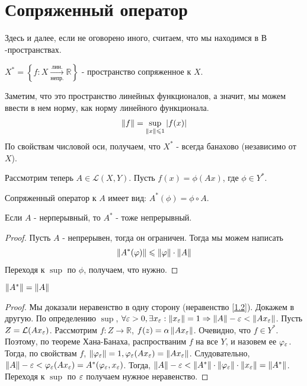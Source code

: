 \section{Сопряженный оператор}

Здесь и далее, если не оговорено иного, считаем, что мы находимся в $В$-пространствах.

\begin{definition}
	$X^* = \left\{ f : X \xrightarrow[\text{непр.}]{\text{лин.}} \mathbb{R} \right\}$ - пространство сопряженное к $X$.
\end{definition}
Заметим, что это пространство линейных функционалов, а значит, мы можем ввести в нем норму, как норму линейного функционала.
\begin{gather}
	\left\|f\right\| = \sup\limits_{\left\|x\right\| \leqslant 1} \left|f(x)\right| 
\end{gather}
По свойствам числовой оси, получаем, что $X^*$ - всегда банахово (независимо от $X$).

Рассмотрим теперь $A \in \mathcal{L}(X, Y)$. Пусть $f(x) = \phi(Ax)$, где $\phi \in Y^*$.
\begin{definition}
	Сопряженный оператор к $A$ имеет вид: $A^*(\phi) = \phi \circ A$.
\end{definition}
\begin{statement}
	Если $A$ - нерперывный, то $A^*$ - тоже непрерывный.
\end{statement}
\begin{proof}
	Пусть $A$ - непрерывен, тогда он ограничен. Тогда мы можем написать
	\begin{gather}
		\left\|A^*(\varphi)\right\| \leqslant \left\|\varphi\right\| \cdot \left\|A\right\| \label{1.2}
	\end{gather}
	Переходя к $\sup$ по $\phi$, получаем, что нужно.
\end{proof}
\begin{theorem}
	$\left\|A^*\right\| = \left\|A\right\|$ \label{th1.2}
\end{theorem}
\begin{proof}
	Мы доказали неравенство в одну сторону (неравенство \ref{1.2}). Докажем в другую. 
	По определению $\sup$, $\forall \varepsilon > 0, \exists x_{\varepsilon} : \left\|x_{\varepsilon}\right\| = 1 \Rightarrow \left\|A\right\| - \varepsilon < \left\|Ax_{\varepsilon}\right\|$.
	Пусть $Z = \mathcal{L}(Ax_{\varepsilon})$. Рассмотрим $f : Z \rightarrow \mathbb{R}$, $f(z) = \alpha\left\|Ax_{\varepsilon}\right\|$. Очевидно, что $f \in Y^*$. 
	Поэтому, по теореме Хана-Банаха, распростваним $f$ на все $Y$, и назовем ее $\varphi_{\varepsilon}$.
	Тогда, по свойствам $f$, $\left\|\varphi_{\varepsilon}\right\| = 1, \varphi_{\varepsilon}(Ax_{\varepsilon}) = \left\|Ax_{\varepsilon}\right\|$.
	Слудовательно, $\left\|A\right\| - \varepsilon < \varphi_{\varepsilon}(Ax_{\varepsilon}) = A^*(\varphi_{\varepsilon}, x_{\varepsilon})$.
	Тогда, $\left\|A\right\| - \varepsilon < \left\|A^*\right\| \cdot \left\|\varphi_{\varepsilon}\right\| \cdot \left\|x_{\varepsilon}\right\| = \left\|A^*\right\|$. 
	Переходя к $\sup$ по $\varepsilon$ получаем нужное неравенство.
\end{proof}

